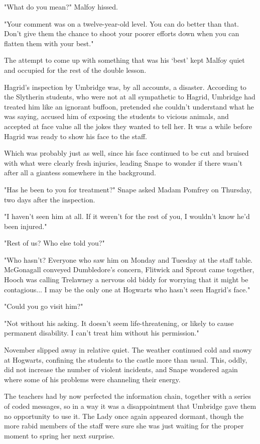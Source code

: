 "What do you mean?" Malfoy hissed.

"Your comment was on a twelve-year-old level. You can do better than that. Don't give them the chance to shoot your poorer efforts down when you can flatten them with your best."

The attempt to come up with something that was his `best' kept Malfoy quiet and occupied for the rest of the double lesson.

Hagrid's inspection by Umbridge was, by all accounts, a disaster. According to the Slytherin students, who were not at all sympathetic to Hagrid, Umbridge had treated him like an ignorant buffoon, pretended she couldn't understand what he was saying, accused him of exposing the students to vicious animals, and accepted at face value all the jokes they wanted to tell her. It was a while before Hagrid was ready to show his face to the staff.

Which was probably just as well, since his face continued to be cut and bruised with what were clearly fresh injuries, leading Snape to wonder if there wasn't after all a giantess somewhere in the background.

"Has he been to you for treatment?" Snape asked Madam Pomfrey on Thursday, two days after the inspection.

"I haven't seen him at all. If it weren't for the rest of you, I wouldn't know he'd been injured."

"Rest of us? Who else told you?"

"Who hasn't? Everyone who saw him on Monday and Tuesday at the staff table. McGonagall conveyed Dumbledore's concern, Flitwick and Sprout came together, Hooch was calling Trelawney a nervous old biddy for worrying that it might be contagious... I may be the only one at Hogwarts who hasn't seen Hagrid's face."

"Could you go visit him?"

"Not without his asking. It doesn't seem life-threatening, or likely to cause permanent disability. I can't treat him without his permission."

\sbreak

November slipped away in relative quiet. The weather continued cold and snowy at Hogwarts, confining the students to the castle more than usual. This, oddly, did not increase the number of violent incidents, and Snape wondered again where some of his problems were channeling their energy.

The teachers had by now perfected the information chain, together with a series of coded messages, so in a way it was a disappointment that Umbridge gave them no opportunity to use it. The Lady once again appeared dormant, though the more rabid members of the staff were sure she was just waiting for the proper moment to spring her next surprise.


